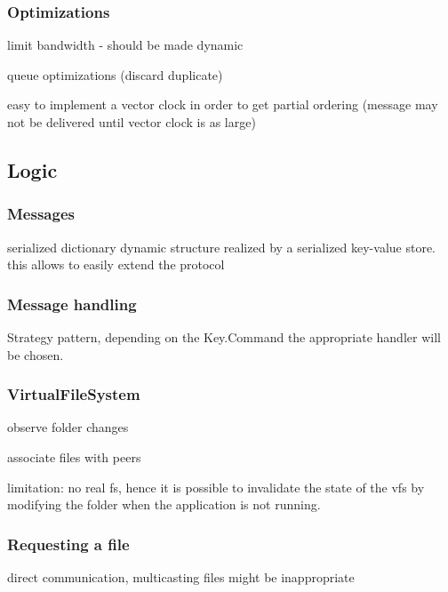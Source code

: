 \subsubsection{Optimizations}

limit bandwidth 
    - should be made dynamic
    
    
queue optimizations (discard duplicate)

easy to implement a vector clock in order to get partial ordering  (message may not be delivered until vector clock is as large)

\subsection{Logic}

    
    \subsubsection{Messages}
    serialized dictionary
    dynamic structure realized by a serialized key-value store. 
    this allows to easily extend the protocol


    \subsubsection{Message handling}
    Strategy pattern, depending on the Key.Command the appropriate handler will be chosen.
    
    \subsubsection{VirtualFileSystem}
    
    observe folder changes
    
    associate files with peers
    
    limitation: no real fs, hence it is possible to invalidate the state of the vfs by modifying the folder when the application is not running. 
    
    \subsubsection{Requesting a file}
    
    direct communication, multicasting files might be inappropriate
    
